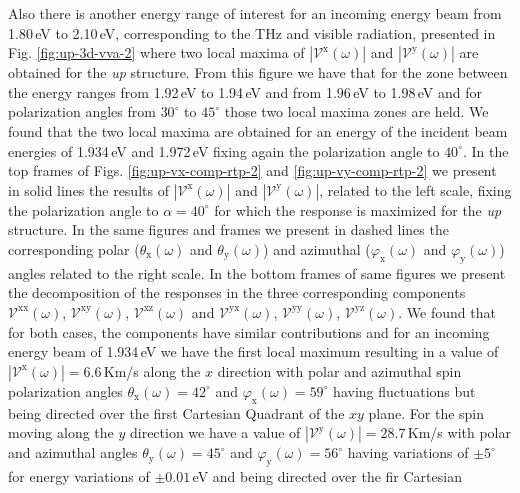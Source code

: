 \documentclass[prb,11pt,tightenlines,twocolumn,aps]{revtex4-1}
\begin{document}
Also there is another energy range of interest for an incoming energy beam from
1.80\,eV to 2.10\,eV, corresponding to the THz and visible radiation, presented
in Fig. \ref{fig:up-3d-vva-2} where two local maxima of
$|\mathcal{V}^{\mathrm{x}}(\omega)|$ and $|\mathcal{V}^{\mathrm{y}}(\omega)|$
are obtained for the \emph{up} structure.
% 
From this figure we have that for the zone between the energy ranges from
1.92\,eV to 1.94\,eV and from 1.96\,eV to 1.98\,eV and for polarization angles
from $30^{\circ}$ to $45^{\circ}$ those two local maxima zones are held.
% 
We found that the two local maxima are obtained for an energy of the incident
beam energies of 1.934\,eV and 1.972\,eV fixing again the polarization angle to
$40^{\circ}$. 
In the top frames of Figs. \ref{fig:up-vx-comp-rtp-2} and 
% 
\ref{fig:up-vy-comp-rtp-2} we present in solid lines the results of
$|\mathcal{V}^{\mathrm{x}}(\omega)|$ and $|\mathcal{V}^{\mathrm{y}}(\omega)|$,
related to the left scale, fixing the polarization angle to $\alpha=40^{\circ}$
for which the response is maximized for the \emph{up} structure. In the same
figures and frames we present in dashed lines the corresponding polar
($\theta_{\mathrm{x}}(\omega)$ and $\theta_{\mathrm{y}}(\omega)$) and azimuthal
($\varphi_{\mathrm{x}}(\omega)$ and $\varphi_{\mathrm{y}}(\omega)$) angles
related to the right scale. In the bottom frames of same figures we present the
decomposition of the responses in the three corresponding components
$\mathcal{V}^{\mathrm{xx}}(\omega)$, $\mathcal{V}^{\mathrm{xy}}(\omega)$,
$\mathcal{V}^{\mathrm{xz}}(\omega)$ and $\mathcal{V}^{\mathrm{yx}}(\omega)$,
$\mathcal{V}^{\mathrm{yy}}(\omega)$, $\mathcal{V}^{\mathrm{yz}}(\omega)$. 
% 
We found that for both cases, the components have similar contributions and for
an incoming energy beam of 1.934\,eV  we have the first local maximum resulting
in a value of $|\mathcal{V}^{\mathrm{x}}(\omega)|= 6.6$\,Km/s along the $x$
direction  with polar and azimuthal spin polarization angles
$\theta_{\mathrm{x}}(\omega)= 42^{\circ}$ and
$\varphi_{\mathrm{x}}(\omega)=59^{\circ}$ having fluctuations but being directed
over the first Cartesian Quadrant of the $xy$ plane.
% 
For the spin moving along the $y$ direction we have a value of
$|\mathcal{V}^{\mathrm{y}}(\omega)|=28.7$\,Km/s with polar and azimuthal angles
$\theta_{\mathrm{y}}(\omega)=45^{\circ}$ and
$\varphi_{\mathrm{y}}(\omega)=56^{\circ}$ having variations of $\pm5^{\circ}$
for energy variations of $\pm0.01$\,eV and being directed over the fir Cartesian
\end{document}
